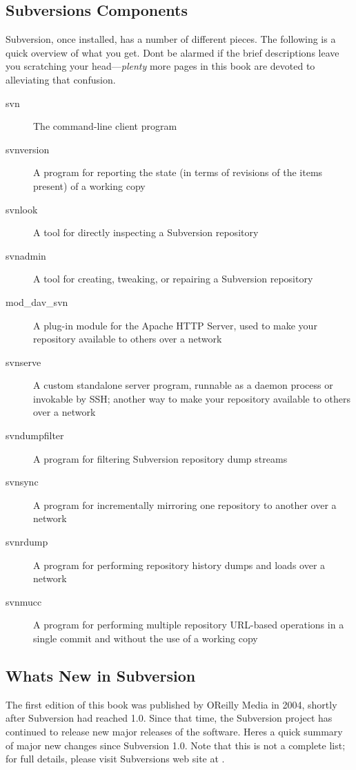 \subsection{Subversion\textquotesingle s
Components}\label{svn.intro.components}

Subversion, once installed, has a number of different pieces. The
following is a quick overview of what you get. Don\textquotesingle t be
alarmed if the brief descriptions leave you scratching your
head---\emph{plenty} more pages in this book are devoted to alleviating
that confusion.

\begin{description}
\item[svn]
The command-line client program
\item[svnversion]
A program for reporting the state (in terms of revisions of the items
present) of a working copy
\item[svnlook]
A tool for directly inspecting a Subversion repository
\item[svnadmin]
A tool for creating, tweaking, or repairing a Subversion repository
\item[mod\_dav\_svn]
A plug-in module for the Apache HTTP Server, used to make your
repository available to others over a network
\item[svnserve]
A custom standalone server program, runnable as a daemon process or
invokable by SSH; another way to make your repository available to
others over a network
\item[svndumpfilter]
A program for filtering Subversion repository dump streams
\item[svnsync]
A program for incrementally mirroring one repository to another over a
network
\item[svnrdump]
A program for performing repository history dumps and loads over a
network
\item[svnmucc]
A program for performing multiple repository URL-based operations in a
single commit and without the use of a working copy
\end{description}

\subsection{What\textquotesingle s New in
Subversion}\label{svn.intro.whatsnew}

The first edition of this book was published by O\textquotesingle Reilly
Media in 2004, shortly after Subversion had reached 1.0. Since that
time, the Subversion project has continued to release new major releases
of the software. Here\textquotesingle s a quick summary of major new
changes since Subversion 1.0. Note that this is not a complete list; for
full details, please visit Subversion\textquotesingle s web site at
\href{https://subversion.apache.org}{}.


